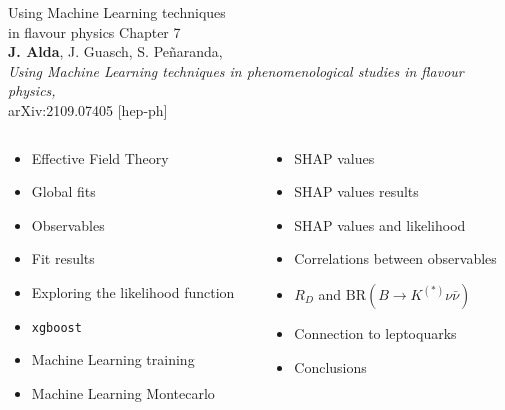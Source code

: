 \documentclass[mathserif, 10pt, dvipsnames]{beamer}
\begin{document}
\begin{frame}[plain] %
\begin{block}{\huge Using Machine Learning techniques \\ in flavour physics}
    Chapter 7\\
    {\color{red} \textbf{J. Alda}, J. Guasch, S. Peñaranda,\\
    \textit{\footnotesize Using Machine Learning techniques in phenomenological studies in flavour physics,}\\
    arXiv:2109.07405 [hep-ph]}
\end{block}
\vspace{0.5cm}

\begin{columns}
\begin{column}{0.48\textwidth}
\begin{itemize}
\item Effective Field Theory
\item Global fits
\item Observables
\item Fit results
\item Exploring the likelihood function
\item \texttt{xgboost}
\item Machine Learning training
\item Machine Learning Montecarlo
\end{itemize}
\end{column}
\begin{column}{0.48\textwidth}
\begin{itemize}
\item SHAP values
\item SHAP values results
\item SHAP values and likelihood
\item Correlations between observables
\item $R_D$ and $\mathrm{BR}(B\to K^{(*)}\nu\bar{\nu})$
\item Connection to leptoquarks
\item Conclusions
\end{itemize}
\end{column}
\end{columns}

\end{frame}
\end{document}
